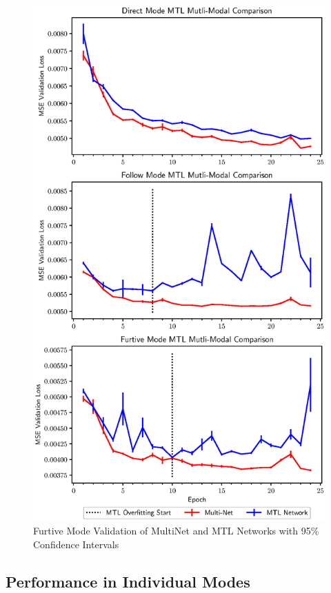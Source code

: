 \begin{figure}[t]
\centering
\includegraphics[width=\linewidth]{paper/content/images/individual_new}
\caption{Furtive Mode Validation of MultiNet and MTL Networks with 95\% Confidence Intervals}

\label{fig:furtivegraph}
\end{figure}


\subsection{Performance in Individual Modes}

